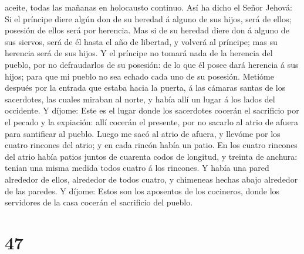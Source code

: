 aceite, todas las mañanas en holocausto continuo.  Así ha
dicho el Señor Jehová: Si el príncipe diere algún don de su heredad á
alguno de sus hijos, será de ellos; posesión de ellos será por herencia.
 Mas si de su heredad diere don á alguno de sus siervos,
será de él hasta el año de libertad, y volverá al príncipe; mas su
herencia será de sus hijos.  Y el príncipe no tomará nada
de la herencia del pueblo, por no defraudarlos de su posesión: de lo que
él posee dará herencia á sus hijos; para que mi pueblo no sea echado
cada uno de su posesión.  Metióme después por la entrada
que estaba hacia la puerta, á las cámaras santas de los sacerdotes, las
cuales miraban al norte, y había allí un lugar á los lados del
occidente.  Y díjome: Este es el lugar donde los
sacerdotes cocerán el sacrificio por el pecado y la expiación: allí
cocerán el presente, por no sacarlo al atrio de afuera para santificar
al pueblo.  Luego me sacó al atrio de afuera, y llevóme
por los cuatro rincones del atrio; y en cada rincón había un patio.
 En los cuatro rincones del atrio había patios juntos de
cuarenta codos de longitud, y treinta de anchura: tenían una misma
medida todos cuatro á los rincones.  Y había una pared
alrededor de ellos, alrededor de todos cuatro, y chimeneas hechas abajo
alrededor de las paredes.  Y díjome: Estos son los
aposentos de los cocineros, donde los servidores de la casa cocerán el
sacrificio del pueblo.

\hypertarget{section-46}{%
\section{47}\label{section-46}}

